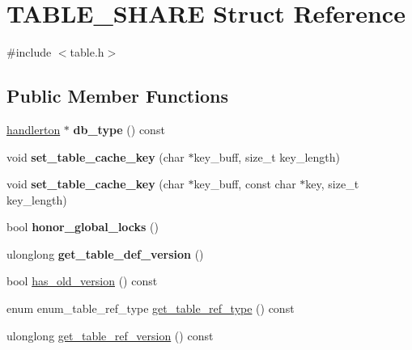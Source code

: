 \hypertarget{structTABLE__SHARE}{}\section{T\+A\+B\+L\+E\+\_\+\+S\+H\+A\+RE Struct Reference}
\label{structTABLE__SHARE}


{\ttfamily \#include $<$table.\+h$>$}

\subsection*{Public Member Functions}
\begin{DoxyCompactItemize}
\item 
\mbox{\label{structTABLE__SHARE_a3584a4257b4863abf5d121aa68b7367c}} 
\mbox{\hyperlink{structhandlerton}{handlerton}} $\ast$ {\bfseries db\+\_\+type} () const
\item 
\mbox{\label{structTABLE__SHARE_abfb6bd113ca575bf522db1c577c2d7ae}} 
void {\bfseries set\+\_\+table\+\_\+cache\+\_\+key} (char $\ast$key\+\_\+buff, size\+\_\+t key\+\_\+length)
\item 
\mbox{\label{structTABLE__SHARE_abc8c03e819aebd0e94325f86184268ae}} 
void {\bfseries set\+\_\+table\+\_\+cache\+\_\+key} (char $\ast$key\+\_\+buff, const char $\ast$key, size\+\_\+t key\+\_\+length)
\item 
\mbox{\label{structTABLE__SHARE_a85e93a607f794a912567104ff63cc8e2}} 
bool {\bfseries honor\+\_\+global\+\_\+locks} ()
\item 
\mbox{\label{structTABLE__SHARE_af38b8e445ebfe7c978c5b13a4c750a92}} 
ulonglong {\bfseries get\+\_\+table\+\_\+def\+\_\+version} ()
\item 
bool \mbox{\hyperlink{structTABLE__SHARE_aa639ddd12ec5072322dee1af1a64efb4}{has\+\_\+old\+\_\+version}} () const
\item 
enum enum\+\_\+table\+\_\+ref\+\_\+type \mbox{\hyperlink{structTABLE__SHARE_ad3a3e3e4c725c1814866341fd65002bf}{get\+\_\+table\+\_\+ref\+\_\+type}} () const
\item 
ulonglong \mbox{\hyperlink{structTABLE__SHARE_a87f19366f330007fb29fa6261961fb06}{get\+\_\+table\+\_\+ref\+\_\+version}} () const

\end{DoxyCompactItemize}

